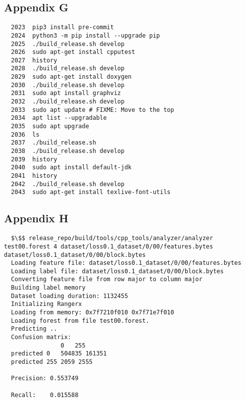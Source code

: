 \documentclass[12pt,oneside]{book}
\begin{document}
\subsection*{Appendix G}

\begin{lstlisting}
  2023  pip3 install pre-commit
  2024  python3 -m pip install --upgrade pip
  2025  ./build_release.sh develop
  2026  sudo apt-get install cpputest
  2027  history
  2028  ./build_release.sh develop
  2029  sudo apt-get install doxygen
  2030  ./build_release.sh develop
  2031  sudo apt install graphviz
  2032  ./build_release.sh develop
  2033  sudo apt update # FIXME: Move to the top
  2034  apt list --upgradable
  2035  sudo apt upgrade
  2036  ls
  2037  ./build_release.sh 
  2038  ./build_release.sh develop
  2039  history
  2040  sudo apt install default-jdk
  2041  history
  2042  ./build_release.sh develop
  2043  sudo apt-get install texlive-font-utils
\end{lstlisting}

\subsection*{Appendix H}

\begin{lstlisting}
  $\$$ release_repo/build/tools/cpp_tools/analyzer/analyzer test00.forest 4 dataset/loss0.1_dataset/0/00/features.bytes dataset/loss0.1_dataset/0/00/block.bytes 
  Loading feature file: dataset/loss0.1_dataset/0/00/features.bytes
  Loading label file: dataset/loss0.1_dataset/0/00/block.bytes
  Converting feature file from row major to column major
  Building label memory
  Dataset loading duration: 1132455
  Initializing Rangerx
  Loading from memory: 0x7f7210f010 0x7f71e7f010
  Loading forest from file test00.forest.
  Predicting ..
  Confusion matrix:
                0   255
  predicted 0   504835 161351
  predicted 255 2059 2555
  
  Precision: 0.553749
  
  Recall:    0.015588  
\end{lstlisting}

\printbibliography[title={Bibliografía},heading=bibintoc]
\end{document}
